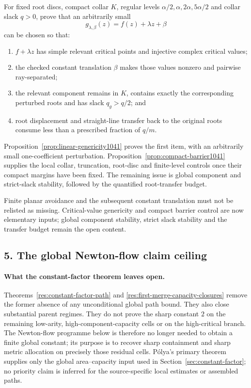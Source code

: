 \documentclass[11pt]{article}
\begin{document}
\begin{problem}\label{prob:perturb1041}
For fixed root discs, compact collar $K$, regular levels
$\alpha/2,\alpha,2\alpha,5\alpha/2$ and collar slack $q>0$, prove that an
arbitrarily small
\[
 g_{\lambda,\beta}(z)=f(z)+\lambda z+\beta
\]
can be chosen so that:

\begin{enumerate}
\item $f+\lambda z$ has simple relevant critical points and injective complex
critical values;
\item the checked constant translation $\beta$ makes those values nonzero and
pairwise ray-separated;
\item the relevant component remains in $K$, contains exactly the corresponding
perturbed roots and has slack $q_g>q/2$; and
\item root displacement and straight-line transfer back to the original roots
consume less than a prescribed fraction of $q/m$.
\end{enumerate}

Proposition~\ref{prop:linear-genericity1041} proves the first item, with an
arbitrarily small one-coefficient perturbation.  Proposition~\ref{prop:compact-barrier1041}
supplies the local collar, truncation, root-disc and finite-level controls once
their compact margins have been fixed.  The remaining issue is global component
and strict-slack stability, followed by the quantified root-transfer budget.
\end{problem}

Finite planar avoidance and the subsequent constant translation must not be
relisted as missing.  Critical-value genericity and compact barrier control are
now elementary inputs; global component stability, strict slack stability and
the transfer budget remain the open content.

\subsection*{5. The global Newton-flow claim ceiling}

\paragraph{What the constant-factor theorem leaves open.}
Theorems~\ref{res:constant-factor-path} and
\ref{res:first-merge-capacity-closures} remove the former absence of any
unconditional global path bound.  They also close substantial parent regimes.
They do not prove the sharp constant $2$ on the remaining low-arity,
high-component-capacity cells or on the high-critical branch.  The Newton-flow
programme below is therefore no longer needed to obtain a finite global
constant; its purpose is to recover sharp containment and sharp metric
allocation on precisely those residual cells.  P\'olya's primary theorem
supplies only the global area--capacity input used in
Section~\ref{sec:constant-factor}; no priority claim is inferred for the
source-specific local estimates or assembled paths.
\end{document}
